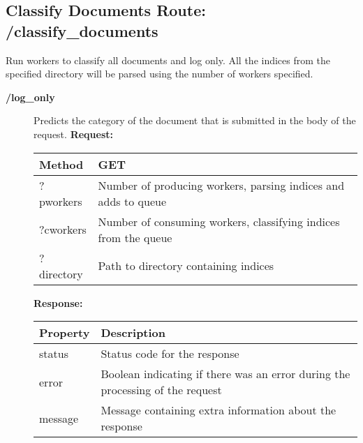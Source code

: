 \subsection{Classify Documents Route: /classify_documents}
Run workers to classify all documents and log only.
All the indices from the specified directory will be parsed using the number of workers specified.

\begin{description}

\item[{\large \textbf{/log\_only}}]
Predicts the category of the document that is submitted in the body of the request.
\newline
\newline
\textbf{Request:}
\newline
\newline
\begin{tabular}{ | l | l |}
\hline
Method & GET\\ \hline
?pworkers & Number of producing workers, parsing indices and adds to queue\\ \hline
?cworkers & Number of consuming workers, classifying indices from the queue\\ \hline
?directory & Path to directory containing indices\\ \hline
\end{tabular}
\newline
\newline
\textbf{Response:}
\newline
\newline
\begin{tabular}{ | l | l |}
\hline
\textbf{Property} & \textbf{Description}\\ \hline
status & Status code for the response\\ \hline
error & Boolean indicating if there was an error during the processing of the request\\ \hline
message & Message containing extra information about the response\\ \hline
\end{tabular}\\


\end{description}

